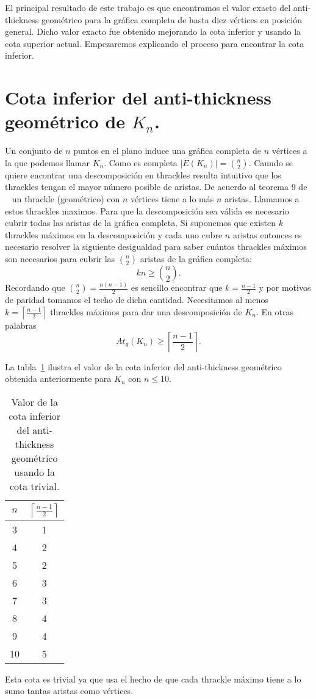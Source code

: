 El principal resultado de este trabajo es que encontramos el valor exacto del
anti-thickness geométrico para la gráfica completa de hasta diez vértices en posición general.
Dicho valor exacto fue obtenido mejorando la cota inferior y usando la cota superior actual.
Empezaremos explicando el proceso para encontrar la cota inferior.
\section{Cota inferior del anti-thickness geométrico de $K_n$.}
Un conjunto de $n$ puntos en el plano induce una gráfica completa de $n$ vértices
a la que podemos llamar $K_n$. Como es completa $|E(K_n)|= \binom{n}{2}$. Caundo se quiere
encontrar una descomposición en thrackles resulta intuitivo que los thrackles tengan el
mayor número posible de aristas. De acuerdo al teorema 9 de ~\cite{Pach2013b}
un thrackle (geométrico) con $n$ vértices tiene a lo más $n$ aristas. Llamamos
a estos thrackles maximos. Para que la descomposición sea válida es necesario
cubrir todas las aristas de la gráfica completa. Si suponemos que existen $k$
thrackles máximos en la descomposición y cada uno cubre $n$ aristas entonces es necesario
resolver la siguiente desigualdad para saber cuántos thrackles máximos son necesarios
para cubrir las $\binom{n}{2}$ aristas de la gráfica completa:
\[ kn \geq \binom{n}{2}. \]
Recordando que $\binom{n}{2} = \frac{n(n-1)}{2}$ es sencillo encontrar que $k=\frac{n-1}{2}$
y por motivos de paridad tomamos el techo de dicha cantidad. Necesitamos al menos
$k=\left\lceil\frac{n-1}{2}\right\rceil$ thrackles máximos para dar una descomposición
de $K_n$. En otras palabras \[At_g(K_n) \geq  \left\lceil\frac{n-1}{2}\right\rceil.\]

La tabla~\ref{table:attrivialinf} ilustra el valor de la cota inferior del anti-thickness
geométrico obtenida anteriormente para $K_n$ con $n\leq 10$.
\begin{table}[t]
  \centering
  \begin{tabular}{|c|c|}
    \hline
    $n$ & $\left\lceil\frac{n-1}{2}\right\rceil$ \\[5pt] \hline\hline
    3   & 1  \\
    4   & 2  \\
    5   & 2  \\
    6   & 3  \\
    7   & 3  \\
    8   & 4  \\
    9   & 4  \\
    10  & 5  \\ \hline
  \end{tabular}
  \caption{ Valor de la cota inferior del anti-thickness geométrico usando la cota trivial. }
  \label{table:attrivialinf}
\end{table}
Esta cota es trivial ya que usa el hecho de que cada thrackle máximo tiene a lo
sumo tantas aristas como vértices.

